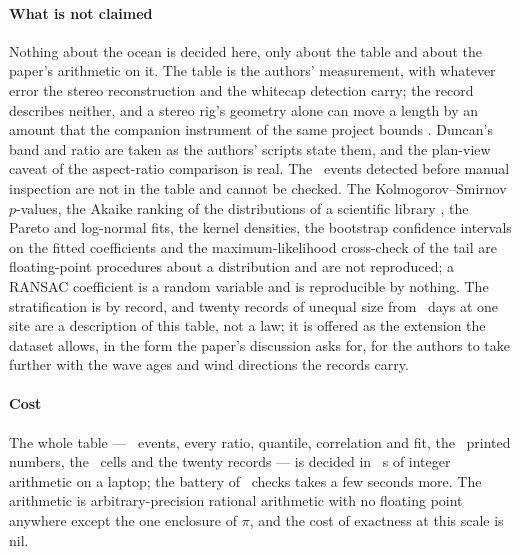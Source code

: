 \documentclass[preprint,11pt,authoryear]{elsarticle}
\begin{document}
\paragraph{What is not claimed}
Nothing about the ocean is decided here, only about the table and about the paper's arithmetic on it. The table is the authors' measurement, with whatever error the stereo reconstruction and the whitecap detection carry; the record describes neither, and a stereo rig's geometry alone can move a length by an amount that the companion instrument of the same project bounds \citep{toledo2026report}. Duncan's band and ratio are taken as the authors' scripts state them, and the plan-view caveat of the aspect-ratio comparison is real. The \InitiallyDetected\ events detected before manual inspection are not in the table and cannot be checked. The Kolmogorov--Smirnov $p$-values, the Akaike ranking of the distributions of a scientific library \citep{virtanen2020}, the Pareto and log-normal fits, the kernel densities, the bootstrap confidence intervals on the fitted coefficients and the maximum-likelihood cross-check of the tail are floating-point procedures about a distribution and are not reproduced; a RANSAC coefficient is a random variable and is reproducible by nothing. The stratification is by record, and twenty records of unequal size from \RecordDays\ days at one site are a description of this table, not a law; it is offered as the extension the dataset allows, in the form the paper's discussion asks for, for the authors to take further with the wave ages and wind directions the records carry.

\paragraph{Cost}
The whole table --- \NEvents\ events, every ratio, quantile, correlation and fit, the \ItemsTotal\ printed numbers, the \TOneCells\ cells and the twenty records --- is decided in \LedgerSeconds\ s of integer arithmetic on a laptop; the battery of \BatteryChecks\ checks takes a few seconds more. The arithmetic is arbitrary-precision rational arithmetic with no floating point anywhere except the one enclosure of $\pi$, and the cost of exactness at this scale is nil.
\end{document}
